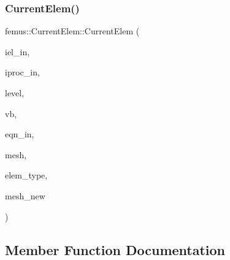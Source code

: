 \subsubsection{\texorpdfstring{Current\+Elem()}{CurrentElem()}}
{\footnotesize\ttfamily femus\+::\+Current\+Elem\+::\+Current\+Elem (\begin{DoxyParamCaption}\item[{const \mbox{\hyperlink{_typedefs_8hpp_a91ad9478d81a7aaf2593e8d9c3d06a14}{uint}}}]{iel\+\_\+in,  }\item[{const \mbox{\hyperlink{_typedefs_8hpp_a91ad9478d81a7aaf2593e8d9c3d06a14}{uint}}}]{iproc\+\_\+in,  }\item[{const \mbox{\hyperlink{_typedefs_8hpp_a91ad9478d81a7aaf2593e8d9c3d06a14}{uint}}}]{level,  }\item[{const \mbox{\hyperlink{_typedefs_8hpp_a91ad9478d81a7aaf2593e8d9c3d06a14}{uint}}}]{vb,  }\item[{const \mbox{\hyperlink{classfemus_1_1_system_two}{System\+Two}} $\ast$}]{eqn\+\_\+in,  }\item[{const \mbox{\hyperlink{classfemus_1_1_multi_level_mesh_two}{Multi\+Level\+Mesh\+Two}} \&}]{mesh,  }\item[{const std\+::vector$<$ std\+::vector$<$ const \mbox{\hyperlink{classfemus_1_1elem__type}{elem\+\_\+type}} $\ast$$>$ $>$ \&}]{elem\+\_\+type,  }\item[{const \mbox{\hyperlink{classfemus_1_1_mesh}{Mesh}} $\ast$}]{mesh\+\_\+new }\end{DoxyParamCaption})}



\subsection{Member Function Documentation}
\mbox{\label{classfemus_1_1_current_elem_a3cff8a3824dda80a7f9d81426f4c37be}} 
